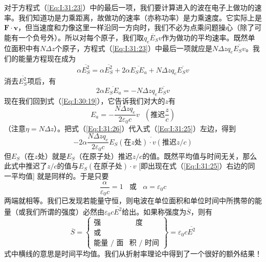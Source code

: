 对于方程式（\ref{Eq:I:31:23}）中的最后一项，我们要计算进入的波在电子上做功的速率。我们知道功是力乘距离，故做功的速率（亦称功率）是力乘速度。它实际上是$\boldsymbol{F}\cdot\boldsymbol{v}$，但当速度和力像这里一样沿同一方向时，我们不必为点乘问题操心（除了可能有一个负号外）。所以对每个原子，我们取$\overline{q_eE_Sv}$作为做功的平均速率。既然单位面积中有$N\Delta z$个原子，方程式（\ref{Eq:I:31:23}）中最后一项就应是$N\Delta zq_e\overline{E_Sv}$。我们的能量方程现在成为
\begin{equation}
    \label{Eq:I:31:24}
    \alpha\overline{E_S^2} = \alpha\overline{E_S^2} + 2\alpha\overline{E_SE_a} + N\Delta zq_e\overline{E_Sv}
\end{equation}
消去$\overline{E_S^2}$项后，有
\begin{equation}
    \label{Eq:I:31:25}
    2\alpha\overline{E_SE_a} = -N\Delta zq_e\overline{E_Sv}
\end{equation}
现在我们回到式（\ref{Eq:I:30:19}），它告诉我们对大的$z$有
\begin{equation}
    \label{Eq:I:31:26}
    E_a = -\frac{N\Delta zq_e}{2\varepsilon_0 c}v ~~~\left (\text{推迟}\frac{z}{c} \right )
\end{equation}
（注意$\eta=N\Delta z$）。把式（\ref{Eq:I:31:26}）代入式（\ref{Eq:I:31:25}）左边，得到
\begin{equation*}
    -2\alpha\frac{N\Delta zq_e}{2\varepsilon_0 c}\overline{E_S(\text{在$z$处})\cdot v(\text{推迟}z/c)}
\end{equation*}
但$E_S$（在$z$处）就是$E_S$（在原子处）推迟$z/c$的值。既然平均值与时间无关，那么此式中推迟了$z/c$的值与$\overline{E_S(\text{在原子处})\cdot v}$ [即出现在式（\ref{Eq:I:31:25}）右边的同一平均值] 就是同样的。于是只要
\begin{equation}
    \label{Eq:I:31:27}
    \frac{\alpha}{\varepsilon_0 c} = 1 ~~~~\text{或}~~~~ \alpha=\varepsilon_0 c
\end{equation}
两端就相等。我们已发现若能量守恒，则电波在单位面积和单位时间中所携带的能量（或我们所谓的强度）必然由$\varepsilon_0c\overline{E^2}$给出。如果称强度为$\overline{S}$，则有
\begin{equation}
    \label{Eq:I:31:28}
    \overline{S} = \left\{
        \begin{aligned}
        \text{强}~~~~~~~~&~~~~\text{度} \\
        \text{或}& \\
        \text{能量 / 面}&\text{积 / 时间}
        \end{aligned}
        \right\} = \varepsilon_0c\overline{E^2}
\end{equation}
式中横线的意思是时间平均值。我们从折射率理论中得到了一个很好的额外结果！

